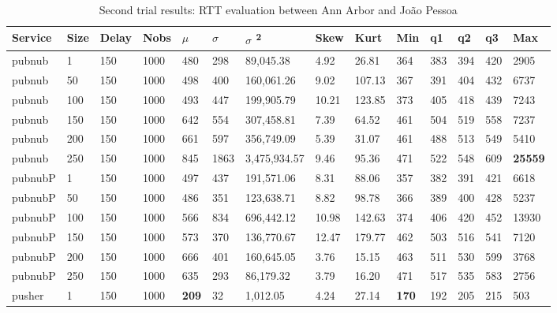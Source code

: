 \begin{table}[!htb]
\small
\centering
\caption{Second trial results: RTT evaluation between Ann Arbor and João Pessoa}
\label{tab:secondtrialarbjpa}
\begin{tabular}{llllllllllllll}
Service    & Size & Delay & Nobs & $\mu$ & $\sigma$  & $\sigma$ \textsuperscript{2} & Skew & Kurt & Min & q1   & q2   & q3   & Max   \\ \midrule
pubnub     & 1            & 150   & 1000 & 480  & 298  & 89,045.38    & 4.92     & 26.81    & 364 & 383 & 394 & 420 & 2905  \\
pubnub     & 50           & 150   & 1000 & 498  & 400  & 160,061.26   & 9.02     & 107.13   & 367 & 391 & 404 & 432 & 6737  \\
pubnub     & 100          & 150   & 1000 & 493  & 447  & 199,905.79   & 10.21    & 123.85   & 373 & 405 & 418 & 439 & 7243  \\
pubnub     & 150          & 150   & 1000 & 642  & 554  & 307,458.81   & 7.39     & 64.52    & 461 & 504 & 519 & 558 & 7237  \\
pubnub     & 200          & 150   & 1000 & 661  & 597  & 356,749.09   & 5.39     & 31.07    & 461 & 488 & 513 & 549 & 5410  \\
pubnub     & 250          & 150   & 1000 & 845  & 1863 & 3,475,934.57 & 9.46     & 95.36    & 471 & 522 & 548 & 609 & \textbf{25559} \\ \hline
pubnubP & 1            & 150   & 1000 & 497  & 437  & 191,571.06   & 8.31     & 88.06    & 357 & 382 & 391 & 421 & 6618  \\
pubnubP & 50           & 150   & 1000 & 486  & 351  & 123,638.71   & 8.82     & 98.78    & 366 & 389 & 400 & 428 & 5237  \\
pubnubP & 100          & 150   & 1000 & 566  & 834  & 696,442.12   & 10.98    & 142.63   & 374 & 406 & 420 & 452 & 13930 \\
pubnubP & 150          & 150   & 1000 & 573  & 370  & 136,770.67   & 12.47    & 179.77   & 462 & 503 & 516 & 541 & 7120  \\
pubnubP & 200          & 150   & 1000 & 666  & 401  & 160,645.05   & 3.76     & 15.15    & 463 & 511 & 530 & 599 & 3768  \\
pubnubP & 250          & 150   & 1000 & 635  & 293  & 86,179.32    & 3.79     & 16.20    & 471 & 517 & 535 & 583 & 2756  \\ \hline
pusher     & 1            & 150   & 1000 & \textbf{209}  & 32   & 1,012.05     & 4.24     & 27.14    & \textbf{170} & 192 & 205 & 215 & 503   \\

\end{tabular}
\end{table}
